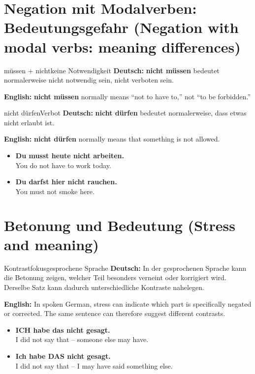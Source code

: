 \documentclass[a4paper,11pt]{article}
\newcommand{\GermanText}[1]{\textbf{Deutsch: }#1\par}
\newcommand{\EnglishText}[1]{{\small\color{SoftGray}\textbf{English: }#1\par}}
\newcommand{\ExampleItem}[2]{\item \textbf{#1}\\{\small\color{SoftGray}#2}}
\begin{document}
\section{Negation mit Modalverben: Bedeutungsgefahr \textnormal{(Negation with modal verbs: meaning differences)}}
\begin{grammarentry}{müssen + nicht}{keine Notwendigkeit}
\GermanText{\textbf{nicht müssen} bedeutet normalerweise \glqq nicht notwendig sein\grqq, nicht \glqq verboten sein\grqq.}
\EnglishText{\textbf{nicht müssen} normally means ``not to have to,'' not ``to be forbidden.''}
\end{grammarentry}
\begin{grammarentry}{nicht dürfen}{Verbot}
\GermanText{\textbf{nicht dürfen} bedeutet normalerweise, dass etwas nicht erlaubt ist.}
\EnglishText{\textbf{nicht dürfen} normally means that something is not allowed.}
\end{grammarentry}
\begin{exbox}\begin{itemize}
\ExampleItem{Du musst heute nicht arbeiten.}{You do not have to work today.}
\ExampleItem{Du darfst hier nicht rauchen.}{You must not smoke here.}
\end{itemize}\end{exbox}

\section{Betonung und Bedeutung \textnormal{(Stress and meaning)}}
\begin{grammarentry}{Kontrastfokus}{gesprochene Sprache}
\GermanText{In der gesprochenen Sprache kann die Betonung zeigen, welcher Teil besonders verneint oder korrigiert wird. Derselbe Satz kann dadurch unterschiedliche Kontraste nahelegen.}
\EnglishText{In spoken German, stress can indicate which part is specifically negated or corrected. The same sentence can therefore suggest different contrasts.}
\end{grammarentry}
\begin{exbox}\begin{itemize}
\ExampleItem{ICH habe das nicht gesagt.}{I did not say that -- someone else may have.}
\ExampleItem{Ich habe DAS nicht gesagt.}{I did not say that -- I may have said something else.}
\end{itemize}\end{exbox}
\end{document}
